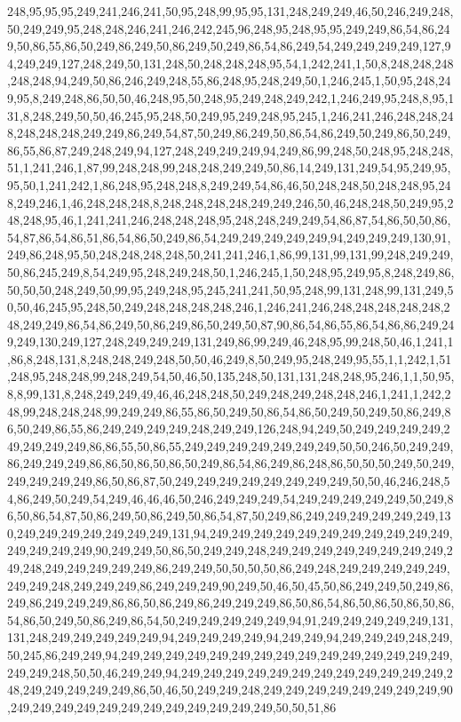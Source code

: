 248,95,95,95,249,241,246,241,50,95,248,99,95,95,131,248,249,249,46,50,246,249,248,50,249,249,95,248,248,246,241,246,242,245,96,248,95,248,95,95,249,249,86,54,86,249,50,86,55,86,50,249,86,249,50,86,249,50,249,86,54,86,249,54,249,249,249,249,127,94,249,249,127,248,249,50,131,248,50,248,248,248,95,54,1,242,241,1,50,8,248,248,248,248,248,94,249,50,86,246,249,248,55,86,248,95,248,249,50,1,246,245,1,50,95,248,249,95,8,249,248,86,50,50,46,248,95,50,248,95,249,248,249,242,1,246,249,95,248,8,95,131,8,248,249,50,50,46,245,95,248,50,249,95,249,248,95,245,1,246,241,246,248,248,248,248,248,248,249,249,86,249,54,87,50,249,86,249,50,86,54,86,249,50,249,86,50,249,86,55,86,87,249,248,249,94,127,248,249,249,249,94,249,86,99,248,50,248,95,248,248,51,1,241,246,1,87,99,248,248,99,248,248,249,249,50,86,14,249,131,249,54,95,249,95,95,50,1,241,242,1,86,248,95,248,248,8,249,249,54,86,46,50,248,248,50,248,248,95,248,249,246,1,46,248,248,248,8,248,248,248,248,249,249,246,50,46,248,248,50,249,95,248,248,95,46,1,241,241,246,248,248,248,95,248,248,249,249,54,86,87,54,86,50,50,86,54,87,86,54,86,51,86,54,86,50,249,86,54,249,249,249,249,249,94,249,249,249,130,91,249,86,248,95,50,248,248,248,248,50,241,241,246,1,86,99,131,99,131,99,248,249,249,50,86,245,249,8,54,249,95,248,249,248,50,1,246,245,1,50,248,95,249,95,8,248,249,86,50,50,50,248,249,50,99,95,249,248,95,245,241,241,50,95,248,99,131,248,99,131,249,50,50,46,245,95,248,50,249,248,248,248,248,246,1,246,241,246,248,248,248,248,248,248,249,249,86,54,86,249,50,86,249,86,50,249,50,87,90,86,54,86,55,86,54,86,86,249,249,249,130,249,127,248,249,249,249,131,249,86,99,249,46,248,95,99,248,50,46,1,241,1,86,8,248,131,8,248,248,249,248,50,50,46,249,8,50,249,95,248,249,95,55,1,1,242,1,51,248,95,248,248,99,248,249,54,50,46,50,135,248,50,131,131,248,248,95,246,1,1,50,95,8,8,99,131,8,248,249,249,49,46,46,248,248,50,249,248,249,248,248,246,1,241,1,242,248,99,248,248,248,99,249,249,86,55,86,50,249,50,86,54,86,50,249,50,249,50,86,249,86,50,249,86,55,86,249,249,249,249,248,249,249,126,248,94,249,50,249,249,249,249,249,249,249,249,86,86,55,50,86,55,249,249,249,249,249,249,249,50,50,246,50,249,249,86,249,249,249,86,86,50,86,50,86,50,249,86,54,86,249,86,248,86,50,50,50,249,50,249,249,249,249,249,86,50,86,87,50,249,249,249,249,249,249,249,249,50,50,46,246,248,54,86,249,50,249,54,249,46,46,46,50,246,249,249,249,54,249,249,249,249,249,50,249,86,50,86,54,87,50,86,249,50,86,249,50,86,54,87,50,249,86,249,249,249,249,249,249,130,249,249,249,249,249,249,249,131,94,249,249,249,249,249,249,249,249,249,249,249,249,249,249,249,90,249,249,50,86,50,249,249,248,249,249,249,249,249,249,249,249,249,248,249,249,249,249,249,86,249,249,50,50,50,50,86,249,248,249,249,249,249,249,249,249,248,249,249,249,86,249,249,249,90,249,50,46,50,45,50,86,249,249,50,249,86,249,86,249,249,249,86,86,50,86,249,86,249,249,249,86,50,86,54,86,50,86,50,86,50,86,54,86,50,249,50,86,249,86,54,50,249,249,249,249,249,94,91,249,249,249,249,249,131,131,248,249,249,249,249,249,94,249,249,249,249,94,249,249,94,249,249,249,248,249,50,245,86,249,249,94,249,249,249,249,249,249,249,249,249,249,249,249,249,249,249,249,249,248,50,50,46,249,249,94,249,249,249,249,249,249,249,249,249,249,249,249,248,249,249,249,249,249,86,50,46,50,249,249,248,249,249,249,249,249,249,249,249,90,249,249,249,249,249,249,249,249,249,249,249,249,50,50,51,86
